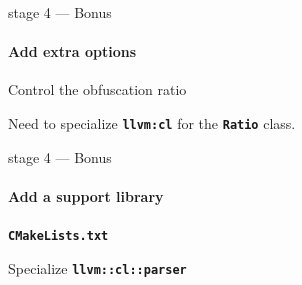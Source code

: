 \documentclass[14pt]{beamer}
\newcommand{\Command}[1]{\textbf{\texttt{#1}}}
\newcommand{\Code}[1]{\textbf{\texttt{#1}}}
\begin{document}

    \begin{frame}[containsverbatim]{stage 4 --- Bonus}
        \framesubtitle{Add extra options}
        \begin{alertblock}{Control the obfuscation ratio}
        {
        \scriptsize
        
        }
        \end{alertblock}
        \vspace{.1em}
        \structure{$\Rightarrow$} Need to specialize \Code{llvm:cl} for the \Code{Ratio} class.
    \end{frame}


    \begin{frame}{stage 4 --- Bonus}
        \framesubtitle{Add a support library}
        \begin{alertblock}{\Code{CMakeLists.txt}}
        {
            \scriptsize
            
        }
        \end{alertblock}

        \begin{alertblock}{Specialize \Code{llvm::cl::parser}}
        {
            \scriptsize
            
        }
        \end{alertblock}
    \end{frame}
\end{document}
